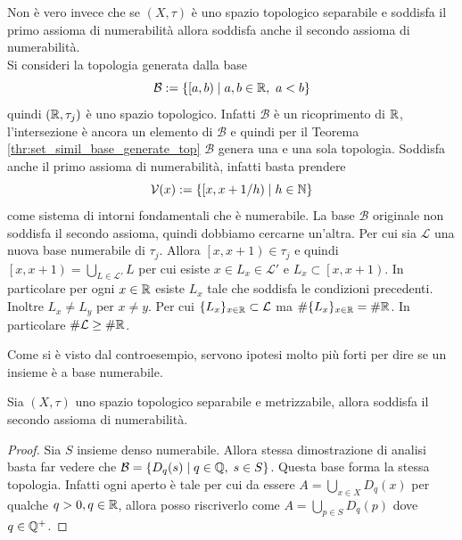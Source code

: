 \begin{remark}
	Non è vero invece che se $(X,\tau)$ è uno spazio topologico separabile e soddisfa il primo assioma di numerabilità allora soddisfa anche il secondo assioma di numerabilità. \\
	Si consideri la topologia generata dalla base
	\begin{equation*}
		\mathcal{B} := \{ \left[a,b\right) \mid a,b \in \mathbb{R},\ a < b \}
	\end{equation*}  
	quindi $(\mathbb{R}, \tau_j)$ è uno spazio topologico. Infatti $\mathcal{B}$ è un ricoprimento di $\mathbb{R}$, l'intersezione è ancora un elemento di $\mathcal{B}$ e quindi per il Teorema \ref{thr:set_simil_base_generate_top} $\mathcal{B}$ genera una e una sola topologia. Soddisfa anche il primo assioma di numerabilità, infatti basta prendere 
	\begin{equation*}
		\mathcal{V}(x) := \{\left[x, x+1/h\right) \mid h \in \mathbb{N} \}
	\end{equation*}
	come sistema di intorni fondamentali che è numerabile. La base $\mathcal{B}$ originale non soddisfa il secondo assioma, quindi dobbiamo cercarne un'altra. Per cui sia $\mathcal{L}$ una nuova base numerabile di $\tau_j$. Allora $\left[x, x+1\right) \in \tau_j$ e quindi $\left[x, x+1\right) = \bigcup_{L \in \mathcal{L}'} L$ per cui esiste $x \in L_x \in \mathcal{L}'$ e $L_x \subset \left[x,x+1\right)$. In particolare per ogni $x \in \mathbb{R}$ esiste $L_x$ tale che soddisfa le condizioni precedenti. Inoltre $L_x \neq L_y$ per $x \neq y$. Per cui $ \{L_x\}_{x\in \mathbb{R}} \subset \mathcal{L}$ ma $\# \{L_x\}_{x\in \mathbb{R}} = \# \mathbb{R}$. In particolare $\# \mathcal{L} \ge \#\mathbb{R}$.
\end{remark}

Come si è visto dal controesempio, servono ipotesi molto più forti per dire se un insieme è a base numerabile.

\begin{theorem}
	Sia $(X, \tau)$ uno spazio topologico separabile e metrizzabile, allora soddisfa il secondo assioma di numerabilità.
\end{theorem}
\begin{proof}
	Sia $S$ insieme denso numerabile. Allora stessa dimostrazione di analisi basta far vedere che $\mathcal{B} = \{ D_q(s) \; | \; q \in \mathbb{Q}, \; s \in S\}$. Questa base forma la stessa topologia. Infatti ogni aperto è tale per cui da essere $A = \bigcup_{x \in X} D_q(x)$ per qualche $q > 0, q\in \mathbb{R}$, allora posso riscriverlo come $A = \bigcup_{p \in S} D_q(p)$ dove $q \in \mathbb{Q}^+$.
\end{proof}


